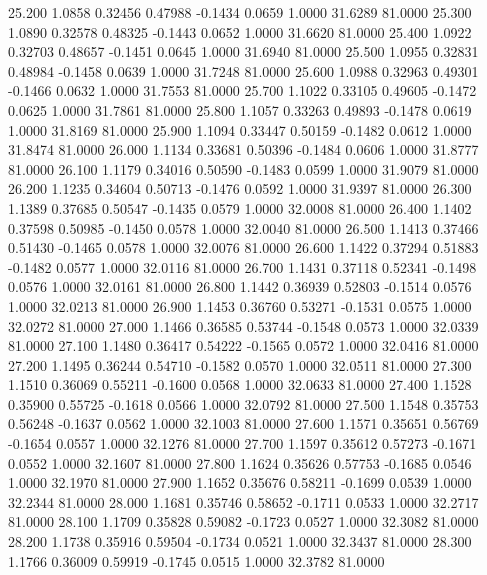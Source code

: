   25.200   1.0858   0.32456   0.47988  -0.1434   0.0659   1.0000  31.6289  81.0000
  25.300   1.0890   0.32578   0.48325  -0.1443   0.0652   1.0000  31.6620  81.0000
  25.400   1.0922   0.32703   0.48657  -0.1451   0.0645   1.0000  31.6940  81.0000
  25.500   1.0955   0.32831   0.48984  -0.1458   0.0639   1.0000  31.7248  81.0000
  25.600   1.0988   0.32963   0.49301  -0.1466   0.0632   1.0000  31.7553  81.0000
  25.700   1.1022   0.33105   0.49605  -0.1472   0.0625   1.0000  31.7861  81.0000
  25.800   1.1057   0.33263   0.49893  -0.1478   0.0619   1.0000  31.8169  81.0000
  25.900   1.1094   0.33447   0.50159  -0.1482   0.0612   1.0000  31.8474  81.0000
  26.000   1.1134   0.33681   0.50396  -0.1484   0.0606   1.0000  31.8777  81.0000
  26.100   1.1179   0.34016   0.50590  -0.1483   0.0599   1.0000  31.9079  81.0000
  26.200   1.1235   0.34604   0.50713  -0.1476   0.0592   1.0000  31.9397  81.0000
  26.300   1.1389   0.37685   0.50547  -0.1435   0.0579   1.0000  32.0008  81.0000
  26.400   1.1402   0.37598   0.50985  -0.1450   0.0578   1.0000  32.0040  81.0000
  26.500   1.1413   0.37466   0.51430  -0.1465   0.0578   1.0000  32.0076  81.0000
  26.600   1.1422   0.37294   0.51883  -0.1482   0.0577   1.0000  32.0116  81.0000
  26.700   1.1431   0.37118   0.52341  -0.1498   0.0576   1.0000  32.0161  81.0000
  26.800   1.1442   0.36939   0.52803  -0.1514   0.0576   1.0000  32.0213  81.0000
  26.900   1.1453   0.36760   0.53271  -0.1531   0.0575   1.0000  32.0272  81.0000
  27.000   1.1466   0.36585   0.53744  -0.1548   0.0573   1.0000  32.0339  81.0000
  27.100   1.1480   0.36417   0.54222  -0.1565   0.0572   1.0000  32.0416  81.0000
  27.200   1.1495   0.36244   0.54710  -0.1582   0.0570   1.0000  32.0511  81.0000
  27.300   1.1510   0.36069   0.55211  -0.1600   0.0568   1.0000  32.0633  81.0000
  27.400   1.1528   0.35900   0.55725  -0.1618   0.0566   1.0000  32.0792  81.0000
  27.500   1.1548   0.35753   0.56248  -0.1637   0.0562   1.0000  32.1003  81.0000
  27.600   1.1571   0.35651   0.56769  -0.1654   0.0557   1.0000  32.1276  81.0000
  27.700   1.1597   0.35612   0.57273  -0.1671   0.0552   1.0000  32.1607  81.0000
  27.800   1.1624   0.35626   0.57753  -0.1685   0.0546   1.0000  32.1970  81.0000
  27.900   1.1652   0.35676   0.58211  -0.1699   0.0539   1.0000  32.2344  81.0000
  28.000   1.1681   0.35746   0.58652  -0.1711   0.0533   1.0000  32.2717  81.0000
  28.100   1.1709   0.35828   0.59082  -0.1723   0.0527   1.0000  32.3082  81.0000
  28.200   1.1738   0.35916   0.59504  -0.1734   0.0521   1.0000  32.3437  81.0000
  28.300   1.1766   0.36009   0.59919  -0.1745   0.0515   1.0000  32.3782  81.0000

